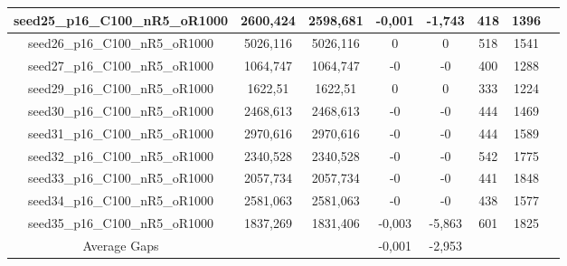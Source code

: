 \documentclass[a4paper]{article}
\begin{document}
\begin{center}
\begin{longtable}{cccccccc}
\hline
seed25\_p16\_C100\_nR5\_oR1000 & 2600,424 & 2598,681 & -0,001 & -1,743 & 418 & 1396\\
\hline
seed26\_p16\_C100\_nR5\_oR1000 & 5026,116 & 5026,116 & 0 & 0 & 518 & 1541\\
\hline
seed27\_p16\_C100\_nR5\_oR1000 & 1064,747 & 1064,747 & -0 & -0 & 400 & 1288\\
\hline
seed29\_p16\_C100\_nR5\_oR1000 & 1622,51 & 1622,51 & 0 & 0 & 333 & 1224\\
\hline
seed30\_p16\_C100\_nR5\_oR1000 & 2468,613 & 2468,613 & -0 & -0 & 444 & 1469\\
\hline
seed31\_p16\_C100\_nR5\_oR1000 & 2970,616 & 2970,616 & -0 & -0 & 444 & 1589\\
\hline
seed32\_p16\_C100\_nR5\_oR1000 & 2340,528 & 2340,528 & -0 & -0 & 542 & 1775\\
\hline
seed33\_p16\_C100\_nR5\_oR1000 & 2057,734 & 2057,734 & -0 & -0 & 441 & 1848\\
\hline
seed34\_p16\_C100\_nR5\_oR1000 & 2581,063 & 2581,063 & -0 & -0 & 438 & 1577\\
\hline
seed35\_p16\_C100\_nR5\_oR1000 & 1837,269 & 1831,406 & -0,003 & -5,863 & 601 & 1825\\
\hline
\hline
Average Gaps & & & -0,001 & -2,953 & & \\
\hline
\hline
\end{longtable}
\end{center}
\end{document}
